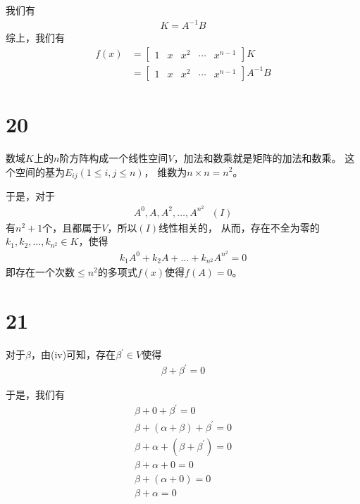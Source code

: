 \documentclass{article}
\begin{document}
我们有
\begin{align*}
  K = A^{-1} B
\end{align*}
综上，我们有
\begin{align*}
  f(x) & = \begin{bmatrix}
             1 & x & x^2 & \cdots & x^{n-1}
           \end{bmatrix} K \\
       & = \begin{bmatrix}
             1 & x & x^2 & \cdots & x^{n-1}
           \end{bmatrix} A^{-1} B
\end{align*}

\section*{20}

数域$K$上的$n$阶方阵构成一个线性空间$V$，加法和数乘就是矩阵的加法和数乘。
这个空间的基为$E_{ij} (1 \leq i,j \leq n)$，
维数为$n \times n = n^2$。

于是，对于
\begin{align*}
  A^{0}, A, A^{2}, \dots, A^{n^2} \ \ \ (I)
\end{align*}
有$n^2 + 1$个，且都属于$V$，所以$(I)$线性相关的，
从而，存在不全为零的$k_1, k_2, \dots, k_{n^2} \in K$，使得
\begin{align*}
  k_1 A^{0} + k_2 A + \dots + k_{n^2} A^{n^2} = 0
\end{align*}
即存在一个次数$\leq n^2$的多项式$f(x)$使得$f(A) = 0$。

\section*{21}

对于$\beta$，由(iv)可知，存在$\beta^\prime \in V$使得
\begin{align*}
  \beta + \beta^\prime = 0
\end{align*}

于是，我们有
\begin{align*}
  \beta + 0 + \beta^\prime = 0                \\
  \beta + (\alpha + \beta) + \beta^\prime = 0 \\
  \beta + \alpha + (\beta + \beta^\prime) = 0 \\
  \beta + \alpha + 0 = 0                      \\
  \beta + (\alpha + 0) = 0                    \\
  \beta + \alpha  = 0
\end{align*}
\end{document}
